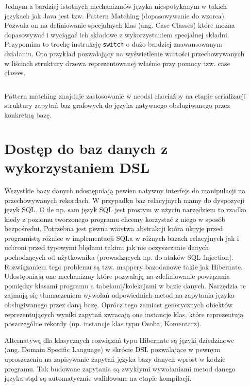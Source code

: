 \documentclass[brudnopis]{xmgr}
\begin{document}
Jednym z bardziej istotnych mechanizmów języka niespotykanym w takich językach jak Java jest tzw. Pattern Matching (dopasowywanie do wzorca). Pozwala on na definiowanie specjalnych klas (ang. Case Classes) które można dopasowywać i wyciągać ich składowe z wykorzystaniem specjalnej składni. Przypomina to trochę instrukcję \texttt{switch} o dużo bardziej zaawansowanym działaniu. Oto przykład pozwalający na wyświetlenie wartości przechowywanych w liściach struktury drzewa reprezentowanej właśnie przy pomocy tzw. case classes.

\inputminted{scala}{listings/scala/pattern-matching-trees.scala}

Pattern matching znajduje zastosowanie w neodsl chociażby na etapie serializacji struktury zapytań baz grafowych do języka natywnego obsługiwanego przez konkretną bazę.

\chapter{Dostęp do baz danych z wykorzystaniem DSL}

Wszystkie bazy danych udostępniają pewien natywny interfejs do manipulacji na przechowywanych rekordach. W przypadku baz relacyjnych mamy do dyspozycji język SQL. O ile np. sam język SQL jest prostym w użyciu narzędziem to rzadko kiedy z poziomu tworzonego programu chcemy korzystać z niego w sposób bezpośredni. Potrzebna jest pewna warstwa abstrakcji która ukryje przed programistą różnice w implementacji SQLa w różnych bazach relacyjnych jak i uchroni przed typowymi błędami takimi jak nie oczyszczanie danych pochodzących od użytkownika (prowadzących np. do ataków SQL Injection). Rozwiązaniem tego problemu są tzw. mappery bazodanowe takie jak Hibernate. Udostępniają one mechanizmy które pozwalają na zdefiniowanie powiązania pomiędzy klasami programu a tabelami/kolekcjami w bazie danych. Narzędzia te zajmują się tłumaczeniem wywołań odpowiednich metod na zapytania języka obsługiwanego przez daną bazę. Oprócz tego zamiast generycznych obiektów reprezentujących wyniki zapytań zwracają one instancje klas, które reprezentują poszczególne rekordy (np. instancje klas typu Osoba, Komentarz).

Alternatywą dla klasycznych rozwiązań typu Hibernate są języki dziedzinowe (ang. Domain Specific Language) w skrócie DSL pozwalające w pewnym uproszczeniu na zapisywanie zapytań języka bazy danych wprost w kodzie programu. Tak budowane zapytania są zwykłymi wywołaniami metod danego języka stąd są automatycznie walidowane na etapie kompilacji.
\end{document}
